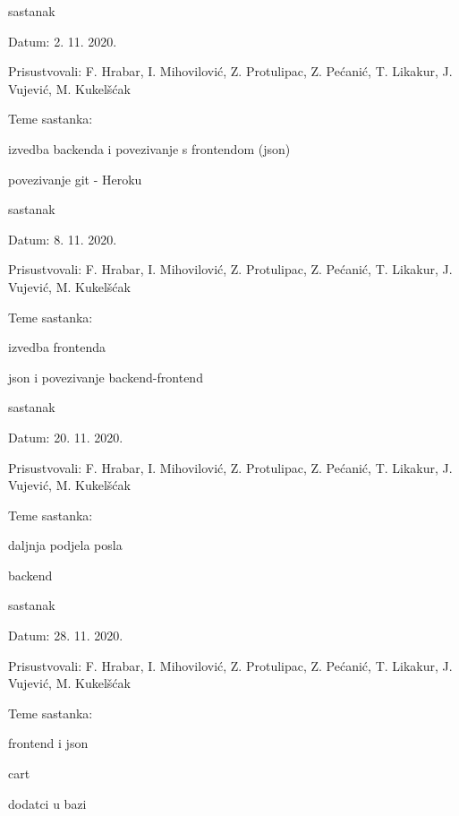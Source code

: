 \begin{packed_enum}
			\item  sastanak
			\item[] \begin{packed_item}
				\item Datum: 2. 11. 2020.
				\item Prisustvovali: F. Hrabar, I. Mihovilović, Z. Protulipac, Z. Pećanić, T. Likakur, J. Vujević, M. Kukelšćak
				\item Teme sastanka:
				\begin{packed_item}
					\item  izvedba backenda i povezivanje s frontendom (json)
					\item  povezivanje git - Heroku
				\end{packed_item}
			\end{packed_item}
			\item  sastanak
			\item[] \begin{packed_item}
				\item Datum: 8. 11. 2020.
				\item Prisustvovali: F. Hrabar, I. Mihovilović, Z. Protulipac, Z. Pećanić, T. Likakur, J. Vujević, M. Kukelšćak
				\item Teme sastanka:
				\begin{packed_item}
					\item  izvedba frontenda
					\item  json i povezivanje backend-frontend
				\end{packed_item}
			\end{packed_item}
			\item  sastanak
			\item[] \begin{packed_item}
				\item Datum: 20. 11. 2020.
				\item Prisustvovali: F. Hrabar, I. Mihovilović, Z. Protulipac, Z. Pećanić, T. Likakur, J. Vujević, M. Kukelšćak
				\item Teme sastanka:
				\begin{packed_item}
					\item  daljnja podjela posla
					\item  backend
				\end{packed_item}
			\end{packed_item}
			\item  sastanak
			\item[] \begin{packed_item}
				\item Datum: 28. 11. 2020.
				\item Prisustvovali: F. Hrabar, I. Mihovilović, Z. Protulipac, Z. Pećanić, T. Likakur, J. Vujević, M. Kukelšćak
				\item Teme sastanka:
				\begin{packed_item}
					\item  frontend i json
					\item  cart
					\item  dodatci u bazi
					

\end{packed_item}
\end{packed_item}
\end{packed_enum}
